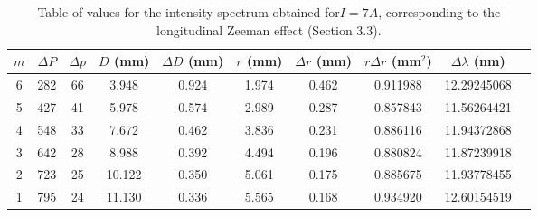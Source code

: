 \documentclass[11pt,twocolumn, a4paper]{article}
\numberwithin{equation}{section} %
\numberwithin{figure}{section} %
\numberwithin{table}{section} %
\begin{document}
\begin{table}[H]
\centering
\caption{Table of values for the intensity spectrum obtained for\(I=7A\), corresponding to the longitudinal Zeeman effect (Section 3.3).}
\begin{tabular}{c c c c c c c c c c}
\hline
$m$ & $\Delta P$ & $\Delta p$ & $D$ (mm) & $\Delta D$ (mm) & $r$ (mm) & $\Delta r$ (mm) & $r\Delta r$ (mm$^2$) & $\Delta \lambda$ (nm) \\
\hline
6 & 282 & 66 & 3.948 & 0.924 & 1.974 & 0.462 & 0.911988 & 12.29245068 \\
5 & 427 & 41 & 5.978 & 0.574 & 2.989 & 0.287 & 0.857843 & 11.56264421 \\
4 & 548 & 33 & 7.672 & 0.462 & 3.836 & 0.231 & 0.886116 & 11.94372868 \\
3 & 642 & 28 & 8.988 & 0.392 & 4.494 & 0.196 & 0.880824 & 11.87239918 \\
2 & 723 & 25 & 10.122 & 0.350 & 5.061 & 0.175 & 0.885675 & 11.93778455 \\
1 & 795 & 24 & 11.130 & 0.336 & 5.565 & 0.168 & 0.934920 & 12.60154519 \\
\hline
\end{tabular}
\end{table}
\end{document}
